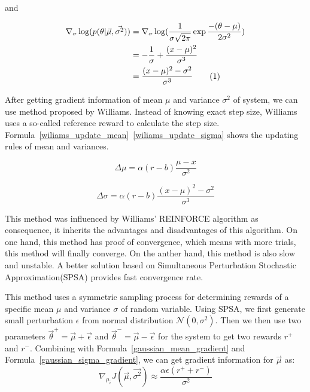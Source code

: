 \documentclass[officiallayout]{tktla}
\newcommand\numberthis{\addtocounter{equation}{1}\tag{\theequation}}
\begin{document}
and 

\begin{align*}
\nabla_\sigma \log(p(\theta| \vec{\mu}, \vec{\sigma^2})) &= \nabla_\sigma \log(\frac{1}{\sigma\sqrt{2\pi}}\exp\frac{-(\theta - \mu)}{2\sigma^2}) \\
&= -\frac{1}{\sigma} + \frac{(x-\mu)^2}{\sigma^3} \\
&= \frac{(x-\mu)^2 - \sigma^2}{\sigma^3}   \numberthis \label{gaussian_sigma_gradient}
\end{align*}

After getting gradient information of mean $\mu$ and variance $\sigma^2$ of system, we can use method proposed by Williams\cite{williams1992simple}. Instead of knowing exact step size, Williams uses a so-called reference reward to calculate the step size. Formula~\ref{wiliams_update_mean}~\ref{wiliams_update_sigma} shows the updating rules of mean and variances.

\begin{equation}
\Delta \mu = \alpha (r - b)\frac{\mu - x}{\sigma^2}
\label{wiliams_update_mean}
\end{equation}

\begin{equation}
\Delta \sigma = \alpha (r - b)\frac{(x-\mu)^2 - \sigma^2}{\sigma^3}
\label{wiliams_update_sigma}
\end{equation}

This method was influenced by Williams' REINFORCE algorithm as consequence, it inherits the advantages and disadvantages of this algorithm. On one hand, this method has proof of convergence, which means with more trials, this method will finally converge. On the anther hand, this method is also slow and unstable. A better solution based on Simultaneous Perturbation Stochastic Approximation(SPSA) provides fast convergence rate.

This method uses a symmetric sampling process for determining rewards of a specific mean $\mu$ and variance $\sigma$ of random variable. Using SPSA, we first generate small perturbation $\epsilon$ from normal distribution $\mathcal{N}(0, \sigma^2)$. Then we then use two parameters $\vec{\theta}^+ = \vec{\mu} + \vec{\epsilon}$ and $\vec{\theta}^- = \vec{\mu} - \vec{\epsilon}$ for the system to get two rewards $r^+$ and $r^-$. Combining with Formula~\ref{gaussian_mean_gradient} and Formula~\ref{gaussian_sigma_gradient}, we can get gradient information for $\vec{\mu}$ as:
\begin{equation}
\nabla_{\mu_i}J(\vec{\mu}, \vec{\sigma^2}) \approx \frac{\alpha\epsilon(r^+ + r^-)}{\sigma^2}
\end{equation}
\end{document}
